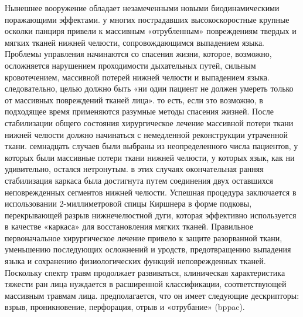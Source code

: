 Нынешнее вооружение обладает незамеченными новыми биодинамическими поражающими
эффектами. у многих пострадавших высокоскоростные крупные осколки панциря
привели к массивным «отрубленным» повреждениям твердых и мягких тканей нижней
челюсти, сопровождающимся выпадением языка. Проблемы управления начинаются со
спасения жизни, которое, возможно, осложняется нарушением проходимости
дыхательных путей, сильным кровотечением, массивной потерей нижней челюсти и
выпадением языка. следовательно, целью должно быть «ни один пациент не должен
умереть только от массивных повреждений тканей лица». то есть, если это
возможно, в подходящее время применяются разумные методы спасения жизней. После
стабилизации общего состояния хирургическое лечение массивной потери ткани
нижней челюсти должно начинаться с немедленной реконструкции утраченной ткани.
семнадцать случаев были выбраны из неопределенного числа пациентов, у которых
были массивные потери ткани нижней челюсти, у которых язык, как ни удивительно,
остался нетронутым. в этих случаях окончательная ранняя стабилизация каркаса
была достигнута путем соединения двух оставшихся неповрежденных сегментов нижней
челюсти. Успешная процедура заключается в использовании 2-миллиметровой спицы
Киршнера в форме подковы, перекрывающей разрыв нижнечелюстной дуги, которая
эффективно используется в качестве «каркаса» для восстановления мягких тканей.
Правильное первоначальное хирургическое лечение привело к защите разорванной
ткани, уменьшению последующих осложнений и уродств, предотвращению выпадения
языка и сохранению физиологических функций неповрежденных тканей. Поскольку
спектр травм продолжает развиваться, клиническая характеристика тяжести ран лица
нуждается в расширенной классификации, соответствующей массивным травмам лица.
предполагается, что он имеет следующие дескрипторы: взрыв, проникновение,
перфорация, отрыв и «отрубание» (bppac).\cite{22892293}

